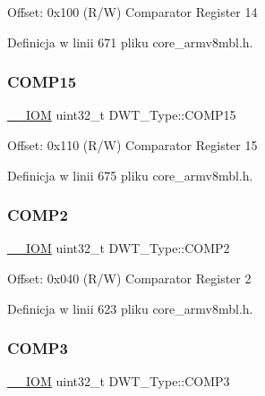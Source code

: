 Offset\+: 0x100 (R/W) Comparator Register 14 

Definicja w linii 671 pliku core\+\_\+armv8mbl.\+h.

\mbox{\label{struct_d_w_t___type_aa46b44e5aacd3ca3937741f423ab480f}} 
\subsubsection{\texorpdfstring{C\+O\+M\+P15}{COMP15}}
{\footnotesize\ttfamily \hyperlink{core__sc300_8h_ab6caba5853a60a17e8e04499b52bf691}{\+\_\+\+\_\+\+I\+OM} uint32\+\_\+t D\+W\+T\+\_\+\+Type\+::\+C\+O\+M\+P15}

Offset\+: 0x110 (R/W) Comparator Register 15 

Definicja w linii 675 pliku core\+\_\+armv8mbl.\+h.

\mbox{\label{struct_d_w_t___type_a5ae6dde39989f27bae90afc2347deb46}} 
\subsubsection{\texorpdfstring{C\+O\+M\+P2}{COMP2}}
{\footnotesize\ttfamily \hyperlink{core__sc300_8h_ab6caba5853a60a17e8e04499b52bf691}{\+\_\+\+\_\+\+I\+OM} uint32\+\_\+t D\+W\+T\+\_\+\+Type\+::\+C\+O\+M\+P2}

Offset\+: 0x040 (R/W) Comparator Register 2 

Definicja w linii 623 pliku core\+\_\+armv8mbl.\+h.

\mbox{\label{struct_d_w_t___type_a85eb73d1848ac3f82d39d6c3e8910847}} 
\subsubsection{\texorpdfstring{C\+O\+M\+P3}{COMP3}}
{\footnotesize\ttfamily \hyperlink{core__sc300_8h_ab6caba5853a60a17e8e04499b52bf691}{\+\_\+\+\_\+\+I\+OM} uint32\+\_\+t D\+W\+T\+\_\+\+Type\+::\+C\+O\+M\+P3}

